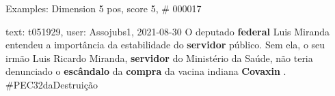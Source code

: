 \begin{frame}{Examples: Dimension 5 pos, score 5, \# 000017}
\footnotesize
\begin{exampleblock}{text: t051929, user: Assojubs1, 2021-08-30}
O deputado \textbf{federal} Luis Miranda entendeu a importância da estabilidade 
do \textbf{servidor} público. Sem ela, o seu irmão Luis Ricardo Miranda, 
\textbf{servidor} do Ministério da Saúde, não teria denunciado o 
\textbf{escândalo} da \textbf{compra} da vacina indiana \textbf{Covaxin} . 
\#PEC32daDestruição 
\end{exampleblock}
\end{frame}
